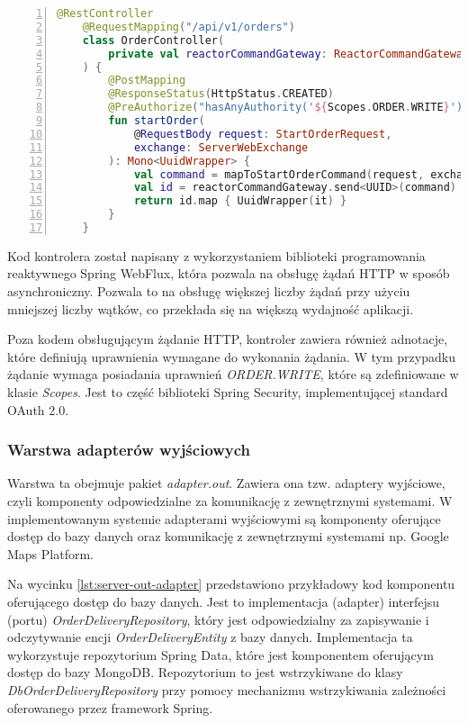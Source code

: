 \begin{lstlisting}[caption={Kod kontrolera REST API obsługującego zapytania dotyczące zamówień},label={lst:server-in-adapter},captionpos=b,language=Kotlin,numbers=left]
    @RestController
    @RequestMapping("/api/v1/orders")
    class OrderController(
        private val reactorCommandGateway: ReactorCommandGateway
    ) {
        @PostMapping
        @ResponseStatus(HttpStatus.CREATED)
        @PreAuthorize("hasAnyAuthority('${Scopes.ORDER.WRITE}')")
        fun startOrder(
            @RequestBody request: StartOrderRequest,
            exchange: ServerWebExchange
        ): Mono<UuidWrapper> {
            val command = mapToStartOrderCommand(request, exchange)
            val id = reactorCommandGateway.send<UUID>(command)
            return id.map { UuidWrapper(it) }
        }
    }
\end{lstlisting}

Kod kontrolera został napisany z wykorzystaniem biblioteki programowania reaktywnego Spring WebFlux, która pozwala na obsługę żądań HTTP w sposób asynchroniczny. Pozwala to na obsługę większej liczby żądań przy użyciu mniejszej liczby wątków, co przekłada się na większą wydajność aplikacji.

Poza kodem obsługującym żądanie HTTP, kontroler zawiera również adnotacje, które definiują uprawnienia wymagane do wykonania żądania. W tym przypadku żądanie wymaga posiadania uprawnień \textit{ORDER.WRITE}, które są zdefiniowane w klasie \textit{Scopes}. Jest to część biblioteki Spring Security, implementującej standard OAuth 2.0.

\subsubsection{Warstwa adapterów wyjściowych} 

Warstwa ta obejmuje pakiet \textit{adapter.out}. Zawiera ona tzw. adaptery wyjściowe, czyli komponenty odpowiedzialne za komunikację z zewnętrznymi systemami. W implementowanym systemie adapterami wyjściowymi są komponenty oferujące dostęp do bazy danych oraz komunikację z zewnętrznymi systemami np. Google Maps Platform.

Na wycinku \ref{lst:server-out-adapter} przedstawiono przykładowy kod komponentu oferującego dostęp do bazy danych. Jest to implementacja (adapter) interfejsu (portu) \textit{OrderDeliveryRepository}, który jest odpowiedzialny za zapisywanie i odczytywanie encji \textit{OrderDeliveryEntity} z bazy danych. Implementacja ta wykorzystuje repozytorium Spring Data, które jest komponentem oferującym dostęp do bazy MongoDB. Repozytorium to jest wstrzykiwane do klasy \textit{DbOrderDeliveryRepository} przy pomocy mechanizmu wstrzykiwania zależności oferowanego przez framework Spring. 

